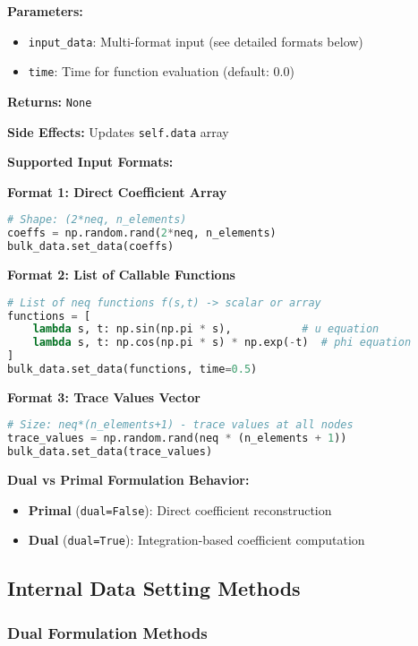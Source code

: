 \textbf{Parameters:}
\begin{itemize}
    \item \texttt{input\_data}: Multi-format input (see detailed formats below)
    \item \texttt{time}: Time for function evaluation (default: 0.0)
\end{itemize}

\textbf{Returns:} \texttt{None}

\textbf{Side Effects:} Updates \texttt{self.data} array

\textbf{Supported Input Formats:}

\textbf{Format 1: Direct Coefficient Array}
\begin{lstlisting}[language=Python, caption=Direct Array Input]
# Shape: (2*neq, n_elements)
coeffs = np.random.rand(2*neq, n_elements)
bulk_data.set_data(coeffs)
\end{lstlisting}

\textbf{Format 2: List of Callable Functions}
\begin{lstlisting}[language=Python, caption=Function List Input]
# List of neq functions f(s,t) -> scalar or array
functions = [
    lambda s, t: np.sin(np.pi * s),           # u equation
    lambda s, t: np.cos(np.pi * s) * np.exp(-t)  # phi equation
]
bulk_data.set_data(functions, time=0.5)
\end{lstlisting}

\textbf{Format 3: Trace Values Vector}
\begin{lstlisting}[language=Python, caption=Trace Vector Input]
# Size: neq*(n_elements+1) - trace values at all nodes
trace_values = np.random.rand(neq * (n_elements + 1))
bulk_data.set_data(trace_values)
\end{lstlisting}

\textbf{Dual vs Primal Formulation Behavior:}
\begin{itemize}
    \item \textbf{Primal} (\texttt{dual=False}): Direct coefficient reconstruction
    \item \textbf{Dual} (\texttt{dual=True}): Integration-based coefficient computation
\end{itemize}

\subsection{Internal Data Setting Methods}
\label{subsec:internal_data_methods}

\subsubsection{Dual Formulation Methods}

